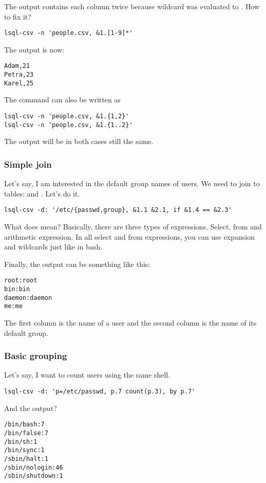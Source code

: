 The output contains each column twice because wildcard  was evaluated to .
How to fix it?
\begin{verbatim}
lsql-csv -n 'people.csv, &1.[1-9]*'
\end{verbatim}
The output is now:
\begin{verbatim}
Adam,21
Petra,23
Karel,25
\end{verbatim}

The command can also be written as
\begin{verbatim}
lsql-csv -n 'people.csv, &1.{1,2}'
lsql-csv -n 'people.csv, &1.{1..2}'
\end{verbatim}
The output will be in both cases still the same.


\subsubsection{Simple join}
Let's say, I am interested in the default group names of users. We need to join to tables:  and . Let's do it.
\begin{verbatim}
lsql-csv -d: '/etc/{passwd,group}, &1.1 &2.1, if &1.4 == &2.3'
\end{verbatim}
What does  mean? Basically, there are three types of expressions. Select, from and arithmetic expression. In all select and from expressions, you can use expansion and wildcards just like in bash\cite{bash-reference-manual}.

Finally, the output can be something like this:
\begin{verbatim}
root:root
bin:bin
daemon:daemon
me:me
\end{verbatim}
The first column is the name of a user and the second column is the name of its default group.


\subsubsection{Basic grouping}
Let's say, I want to count users using the same shell.
\begin{verbatim}
lsql-csv -d: 'p=/etc/passwd, p.7 count(p.3), by p.7'
\end{verbatim}
And the output?
\begin{verbatim}
/bin/bash:7
/bin/false:7
/bin/sh:1
/bin/sync:1
/sbin/halt:1
/sbin/nologin:46
/sbin/shutdown:1
\end{verbatim}

